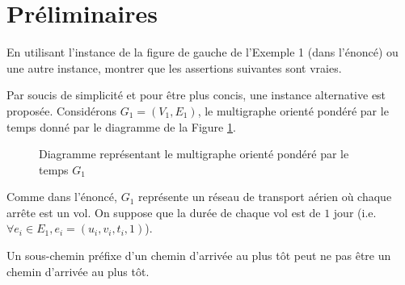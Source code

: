 
\section{Préliminaires}
\label{sec:preliminaires}

\begin{question}
  En utilisant l'instance de la figure de gauche de l'Exemple 1 (dans l'énoncé)
  ou une autre instance, montrer que les assertions suivantes sont vraies.
\end{question}

Par soucis de simplicité et pour être plus concis, une instance alternative est
proposée. Considérons $G_{1} = (V_1,E_1)$, le multigraphe orienté pondéré par le
temps donné par le diagramme de la Figure \ref{fig:G1}.

\begin{figure}[h!]
  \centering
  \caption{Diagramme représentant le multigraphe orienté pondéré par le temps
    $G_{1}$}
  \label{fig:G1}
\end{figure}

Comme dans l'énoncé, $G_1$ représente un réseau de transport aérien où chaque
arrête est un vol. On suppose que la durée de chaque vol est de $1$ jour (i.e.\
$\forall e_i \in E_1, e_i = (u_i, v_i, t_i, 1)$).

\begin{assertion}
  Un sous-chemin préfixe d'un chemin d'arrivée au plus tôt peut ne pas
  être un chemin d'arrivée au plus tôt.
\end{assertion}


